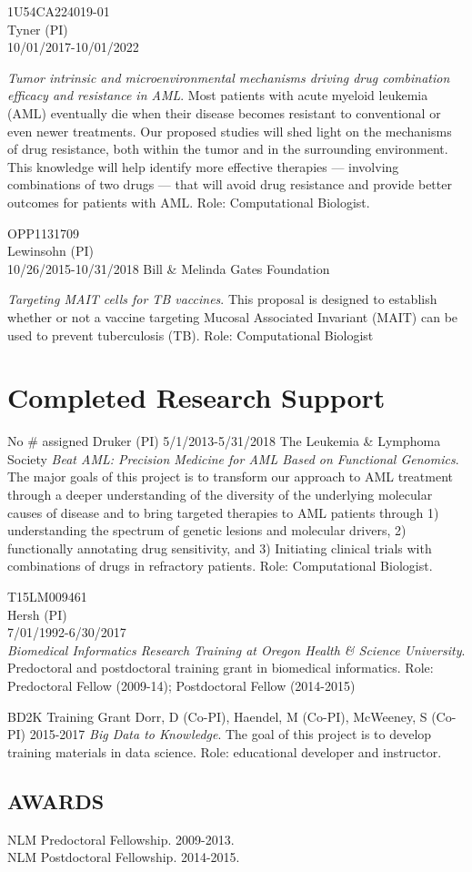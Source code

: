 \documentclass[11pt,]{article}
\begin{document}
1U54CA224019-01\\
Tyner (PI)\\
10/01/2017-10/01/2022

\emph{Tumor intrinsic and microenvironmental mechanisms driving drug
combination efficacy and resistance in AML}. Most patients with acute
myeloid leukemia (AML) eventually die when their disease becomes
resistant to conventional or even newer treatments. Our proposed studies
will shed light on the mechanisms of drug resistance, both within the
tumor and in the surrounding environment. This knowledge will help
identify more effective therapies --- involving combinations of two
drugs --- that will avoid drug resistance and provide better outcomes
for patients with AML. Role: Computational Biologist.

OPP1131709\\
Lewinsohn (PI)\\
10/26/2015-10/31/2018 Bill \& Melinda Gates Foundation

\emph{Targeting MAIT cells for TB vaccines}. This proposal is designed
to establish whether or not a vaccine targeting Mucosal Associated
Invariant (MAIT) can be used to prevent tuberculosis (TB). Role:
Computational Biologist

\section{Completed Research Support}\label{completed-research-support}

No \# assigned Druker (PI) 5/1/2013-5/31/2018 The Leukemia \& Lymphoma
Society \emph{Beat AML: Precision Medicine for AML Based on Functional
Genomics}. The major goals of this project is to transform our approach
to AML treatment through a deeper understanding of the diversity of the
underlying molecular causes of disease and to bring targeted therapies
to AML patients through 1) understanding the spectrum of genetic lesions
and molecular drivers, 2) functionally annotating drug sensitivity, and
3) Initiating clinical trials with combinations of drugs in refractory
patients. Role: Computational Biologist.

T15LM009461\\
Hersh (PI)\\
7/01/1992-6/30/2017\\
\emph{Biomedical Informatics Research Training at Oregon Health \&
Science University}. Predoctoral and postdoctoral training grant in
biomedical informatics. Role: Predoctoral Fellow (2009-14); Postdoctoral
Fellow (2014-2015)

BD2K Training Grant Dorr, D (Co-PI), Haendel, M (Co-PI), McWeeney, S
(Co-PI) 2015-2017 \emph{Big Data to Knowledge}. The goal of this project
is to develop training materials in data science. Role: educational
developer and instructor.

\subsection{AWARDS}\label{awards}

NLM Predoctoral Fellowship. 2009-2013.\\
NLM Postdoctoral Fellowship. 2014-2015.
\end{document}
